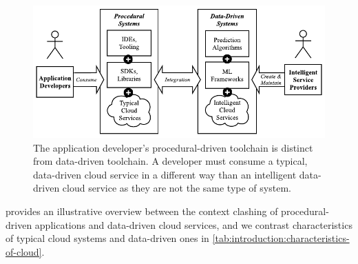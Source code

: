 

\begin{figure}
\centering
\includegraphics[width=0.95\linewidth]{rule-vs-data}
\caption[Differences between data- and procedural-driven cloud services]{The application developer's procedural-driven toolchain is distinct from data-driven toolchain. A developer must consume a typical, data-driven cloud service in a different way than an intelligent data-driven cloud service as they are not the same type of system.}
\label{fig:introduction:rule-vs-data}
\end{figure}

 provides an illustrative overview between the context clashing of procedural-driven applications and data-driven cloud services, and we contrast characteristics of typical cloud systems and data-driven ones in \cref{tab:introduction:characteristics-of-cloud}.


